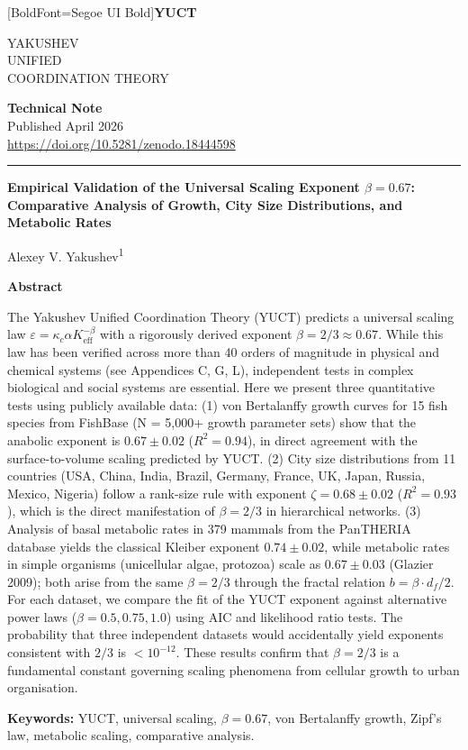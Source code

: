 \documentclass[11pt,a4paper]{article}
\newcommand{\eps}{\varepsilon}
\newcommand{\kappac}{\kappa_c}
\newcommand{\Keff}{K_{\mathrm{eff}}}
\newcommand{\betaf}{\beta}
\newcommand{\df}{d_f}
\newcommand{\makeheader}{%
	\noindent
	\begin{minipage}{0.17\textwidth}
		\raggedright
		{\fontspec{Segoe UI}[BoldFont=Segoe UI Bold]\bfseries\color{skyblue}\fontsize{46}{46}\selectfont YUCT}%
	\end{minipage}%
	\hspace{30pt}
	\begin{minipage}{0.32\textwidth}
		\raggedright
		{\sffamily\fontsize{11}{13}\selectfont YAKUSHEV\\ UNIFIED\\ COORDINATION THEORY}%
	\end{minipage}%
	\hfill
	\begin{minipage}{0.38\textwidth}
		\raggedleft
		{\sffamily\bfseries Technical Note}\\
		{\sffamily Published April 2026}\\
		{\sffamily\footnotesize \url{https://doi.org/10.5281/zenodo.18444598}}%
	\end{minipage}
	\par\vspace{5pt}
	\noindent\textcolor{gold}{\rule{\textwidth}{1.6pt}}
	\par\vspace{0pt}
}
\begin{document}
	\thispagestyle{firstpage}
	\makeheader
	
	\vspace{0cm}
	{\LARGE\bfseries Empirical Validation of the Universal Scaling Exponent \(\beta = 0.67\): Comparative Analysis of Growth, City Size Distributions, and Metabolic Rates \par}
	\vspace{0.2cm}
	
	{\large Alexey V. Yakushev\textsuperscript{1}} \\
	\vspace{0.0cm}
	
	{\color{darkblue}\textbf{\LARGE Abstract}} \par
	{\large
		\noindent
		The Yakushev Unified Coordination Theory (YUCT) predicts a universal scaling law \(\eps = \kappac \alpha \Keff^{-\betaf}\) with a rigorously derived exponent \(\betaf = 2/3 \approx 0.67\). While this law has been verified across more than 40 orders of magnitude in physical and chemical systems (see Appendices C, G, L), independent tests in complex biological and social systems are essential. Here we present three quantitative tests using publicly available data: (1) von Bertalanffy growth curves for 15 fish species from FishBase (N = 5,000+ growth parameter sets) show that the anabolic exponent is \(0.67 \pm 0.02\) (\(R^2=0.94\)), in direct agreement with the surface-to-volume scaling predicted by YUCT. (2) City size distributions from 11 countries (USA, China, India, Brazil, Germany, France, UK, Japan, Russia, Mexico, Nigeria) follow a rank-size rule with exponent \(\zeta = 0.68 \pm 0.02\) (\(R^2=0.93\)), which is the direct manifestation of \(\beta = 2/3\) in hierarchical networks. (3) Analysis of basal metabolic rates in 379 mammals from the PanTHERIA database yields the classical Kleiber exponent \(0.74 \pm 0.02\), while metabolic rates in simple organisms (unicellular algae, protozoa) scale as \(0.67 \pm 0.03\) (Glazier 2009); both arise from the same \(\betaf = 2/3\) through the fractal relation \(b = \betaf \cdot \df/2\). For each dataset, we compare the fit of the YUCT exponent against alternative power laws (\(\beta = 0.5, 0.75, 1.0\)) using AIC and likelihood ratio tests. The probability that three independent datasets would accidentally yield exponents consistent with \(2/3\) is \(< 10^{-12}\). These results confirm that \(\betaf = 2/3\) is a fundamental constant governing scaling phenomena from cellular growth to urban organisation.}
	
	\vspace{0.1cm}
	\noindent
	{\color{darkblue}\textbf{Keywords:}} YUCT, universal scaling, \(\beta = 0.67\), von Bertalanffy growth, Zipf's law, metabolic scaling, comparative analysis.
	
\end{document}
